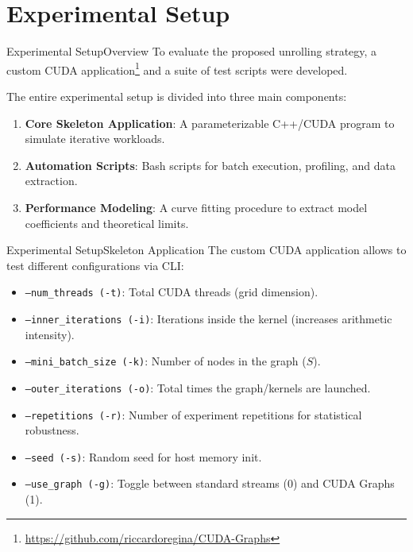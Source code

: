 \documentclass[10pt,aspectratio=43]{beamer}
\begin{document}
\section{Experimental Setup}
\begin{frame}{Experimental Setup}{Overview}
    To evaluate the proposed unrolling strategy, a custom CUDA application\footnote[frame]{\url{https://github.com/riccardoregina/CUDA-Graphs}} and a suite of test scripts were developed. 
    
    The entire experimental setup is divided into three main components:
    \begin{enumerate}
        \item \textbf{Core Skeleton Application}: A parameterizable C++/CUDA program to simulate iterative workloads.
        \item \textbf{Automation Scripts}: Bash scripts for batch execution, profiling, and data extraction.
        \item \textbf{Performance Modeling}: A curve fitting procedure to extract model coefficients and theoretical limits.
    \end{enumerate}
\end{frame}

\begin{frame}{Experimental Setup}{Skeleton Application}
    The custom CUDA application allows to test different configurations via CLI:
    \begin{itemize}
        \item \texttt{---num\_threads (-t)}: Total CUDA threads (grid dimension).
        \item \texttt{---inner\_iterations (-i)}: Iterations inside the kernel (increases arithmetic intensity).
        \item \texttt{---mini\_batch\_size (-k)}: Number of nodes in the graph ($S$).
        \item \texttt{---outer\_iterations (-o)}: Total times the graph/kernels are launched.
        \item \texttt{---repetitions (-r)}: Number of experiment repetitions for statistical robustness.
        \item \texttt{---seed (-s)}: Random seed for host memory init.
        \item \texttt{---use\_graph (-g)}: Toggle between standard streams (0) and CUDA Graphs (1).
    \end{itemize}
\end{frame}
\end{document}
